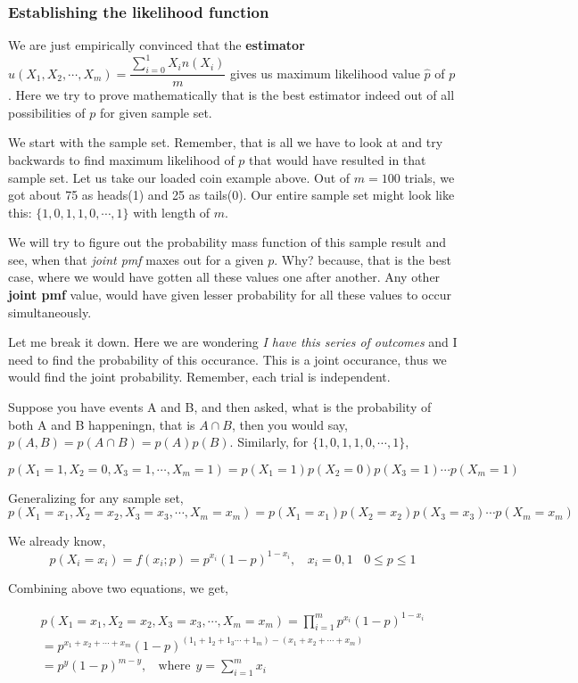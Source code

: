 \documentclass[float=false,crop=false]{standalone}
\begin{document}
\subsubsection{Establishing the likelihood
function}\label{establishing-the-likelihood-function}

We are just empirically convinced that the \textbf{estimator}
\(u(X_1,X_2,\cdots,X_m) = \dfrac{\sum\limits_{i=0}^{1}X_in(X_i)}{m}\)
gives us maximum likelihood value \(\hat{p}\) of \(p\). Here we try to
prove mathematically that is the best estimator indeed out of all
possibilities of \(p\) for given sample set.

We start with the sample set. Remember, that is all we have to look at
and try backwards to find maximum likelihood of \(p\) that would have
resulted in that sample set. Let us take our loaded coin example above.
Out of \(m=100\) trials, we got about 75 as heads(1) and 25 as tails(0).
Our entire sample set might look like this: \(\{ 1,0,1,1,0,\cdots,1\}\)
with length of \(m\).

We will try to figure out the probability mass function of this sample
result and see, when that \emph{joint pmf} maxes out for a given \(p\).
Why? because, that is the best case, where we would have gotten all
these values one after another. Any other \textbf{joint pmf} value,
would have given lesser probability for all these values to occur
simultaneously.

Let me break it down. Here we are wondering \emph{I have this series of
outcomes} and I need to find the probability of this occurance. This is
a joint occurance, thus we would find the joint probability. Remember,
each trial is independent.

Suppose you have events A and B, and then asked, what is the probability
of both A and B happeningn, that is \(A\cap B\), then you would say,
\(p(A,B) = p(A \cap B) = p(A)p(B)\). Similarly, for
\(\{ 1,0,1,1,0,\cdots,1\}\),

\[
p(X_1=1, X_2=0, X_3=1,\cdots,X_m=1) = p(X_1=1)p(X_2=0)p(X_3=1)\cdots p(X_m=1)
\]

Generalizing for any sample set, \[
p(X_1=x_1, X_2=x_2, X_3=x_3,\cdots,X_m=x_m) = p(X_1=x_1)p(X_2=x_2)p(X_3=x_3)\cdots p(X_m=x_m) 
\]

We already know, \[
p(X_i=x_i) = f(x_i;p) = p^{x_i}(1-p)^{1 - x_i}, \ \ \ \ x_i=0,1 \ \ \ \ 0 \leq p \leq 1
\]

Combining above two equations, we get,

\begin{equation}
\begin{aligned}
    p(X_1=x_1, X_2=x_2, X_3=x_3,\cdots,X_m=x_m) = \prod_{i=1}^{m}p^{x_i}(1-p)^{1 - x_i} \\
    = p^{x_1 + x_2 + \cdots + x_m}(1-p)^{(1_1+1_2+1_3\cdots+1_m) - (x_1 + x_2 + \cdots + x_m)} \\
    = p^{y}(1 - p)^{m - y}, \ \ \ \ \text{where} \ \  y = \sum\limits_{i=1}^{m}x_i
\end{aligned}
\end{equation}
\end{document}
